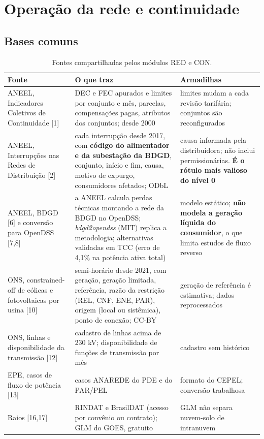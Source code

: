 
\section{Operação da rede e continuidade}

\subsection*{Bases comuns}

\begin{table}[H]
\centering\small
\begin{tabularx}{\textwidth}{P{3.6cm} L P{3.6cm}}
\toprule
\textbf{Fonte} & \textbf{O que traz} & \textbf{Armadilhas} \\
\midrule
ANEEL, Indicadores Coletivos de Continuidade [1] & DEC e FEC apurados e limites por conjunto e mês, parcelas, compensações pagas, atributos dos conjuntos; desde 2000 & limites mudam a cada revisão tarifária; conjuntos são reconfigurados \\
ANEEL, Interrupções nas Redes de Distribuição [2] & cada interrupção desde 2017, com \textbf{código do alimentador e da subestação da BDGD}, conjunto, início e fim, causa, motivo de expurgo, consumidores afetados; ODbL & causa informada pela distribuidora; não inclui permissionárias. \textbf{É o rótulo mais valioso do nível 0} \\
ANEEL, BDGD [6] e conversão para OpenDSS [7,8] & a ANEEL calcula perdas técnicas montando a rede da BDGD no OpenDSS; \emph{bdgd2opendss} (MIT) replica a metodologia; alternativas validadas em TCC (erro de 4,1\% na potência ativa total) & modelo estático; \textbf{não modela a geração líquida do consumidor}, o que limita estudos de fluxo reverso \\
ONS, constrained-off de eólicas e fotovoltaicas por usina [10] & semi-horário desde 2021, com geração, geração limitada, referência, razão da restrição (REL, CNF, ENE, PAR), origem (local ou sistêmica), ponto de conexão; CC-BY & geração de referência é estimativa; dados reprocessados \\
ONS, linhas e disponibilidade da transmissão [12] & cadastro de linhas acima de 230 kV; disponibilidade de funções de transmissão por mês & cadastro sem histórico \\
EPE, casos de fluxo de potência [13] & casos ANAREDE do PDE e do PAR/PEL & formato do CEPEL; conversão trabalhosa \\
Raios [16,17] & RINDAT e BrasilDAT (acesso por convênio ou contrato); GLM do GOES, gratuito & GLM não separa nuvem-solo de intranuvem \\
\bottomrule
\end{tabularx}
\caption{Fontes compartilhadas pelos módulos RED e CON.}
\end{table}

